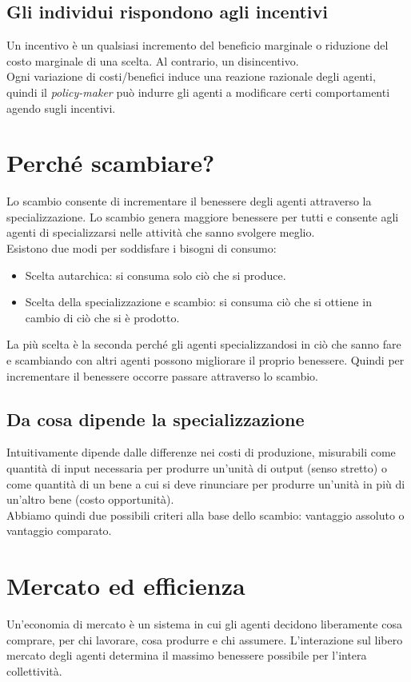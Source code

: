 \documentclass{report}
\begin{document}
	\subsection{Gli individui rispondono agli incentivi}
	Un incentivo è un qualsiasi incremento del beneficio marginale o riduzione del costo marginale di una scelta. Al contrario, un disincentivo.\\Ogni variazione di costi/benefici induce una reazione razionale degli agenti, quindi il \textit{policy-maker} può indurre gli agenti a modificare certi comportamenti agendo sugli incentivi.
	\section{Perché scambiare?}
	Lo scambio consente di incrementare il benessere degli agenti attraverso la specializzazione. Lo scambio genera maggiore benessere per tutti e consente agli agenti di specializzarsi nelle attività che sanno svolgere meglio.
	\medskip \\
	Esistono due modi per soddisfare i bisogni di consumo:
	\begin{itemize}
		\item Scelta autarchica: si consuma solo ciò che si produce.
		\item Scelta della specializzazione e scambio: si consuma ciò che si ottiene in cambio di ciò che si è prodotto.
	\end{itemize}
	La più scelta è la seconda perché gli agenti specializzandosi in ciò che sanno fare e scambiando con altri agenti possono migliorare il proprio benessere. Quindi per incrementare il benessere occorre passare attraverso lo scambio.
	\subsection{Da cosa dipende la specializzazione}
	Intuitivamente dipende dalle differenze nei costi di produzione, misurabili come quantità di input necessaria per produrre un'unità di output (senso stretto) o come quantità di un bene a cui si deve rinunciare per produrre un'unità in più di un'altro bene (costo opportunità).
	\medskip \\ Abbiamo quindi due possibili criteri alla base dello scambio: vantaggio assoluto o vantaggio comparato.
	\section{Mercato ed efficienza}
	Un'economia di mercato è un sistema in cui gli agenti decidono liberamente cosa comprare, per chi lavorare, cosa produrre e chi assumere. L'interazione sul libero mercato degli agenti determina il massimo benessere possibile per l'intera collettività.
\end{document}
